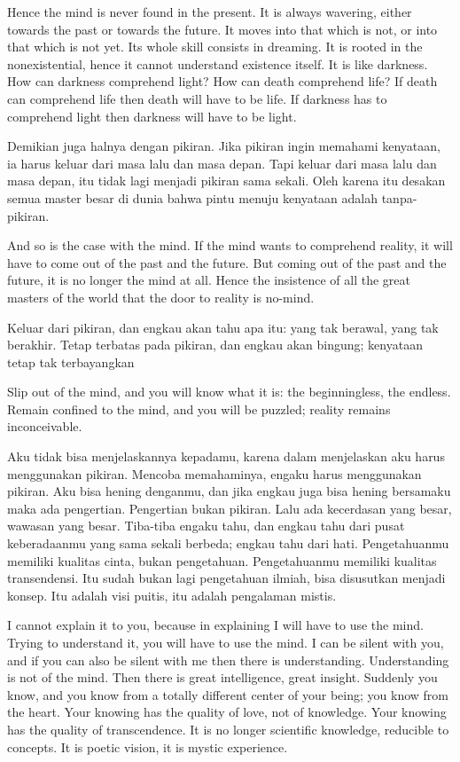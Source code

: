 \english
Hence the mind is never found in the present. It is always wavering, either towards the past or towards the future. It moves into that which is not, or into that which is not yet. Its whole skill consists in dreaming. It is rooted in the nonexistential, hence it cannot understand existence itself. It is like darkness. How can darkness comprehend light? How can death comprehend life? If death can comprehend life then death will have to be life. If darkness has to comprehend light then darkness will have to be light.

\bahasa
Demikian juga halnya dengan pikiran. Jika pikiran ingin memahami kenyataan, ia harus keluar dari masa lalu dan masa depan. Tapi keluar dari masa lalu dan masa depan, itu tidak lagi menjadi pikiran sama sekali. Oleh karena itu desakan semua master besar di dunia bahwa pintu menuju kenyataan adalah tanpa-pikiran.

\english
And so is the case with the mind. If the mind wants to comprehend reality, it will have to come out of the past and the future. But coming out of the past and the future, it is no longer the mind at all. Hence the insistence of all the great masters of the world that the door to reality is no-mind.

\bahasa
Keluar dari pikiran, dan engkau akan tahu apa itu: yang tak berawal, yang tak berakhir. Tetap terbatas pada pikiran, dan engkau akan bingung; kenyataan tetap tak terbayangkan

\english
Slip out of the mind, and you will know what it is: the beginningless, the endless. Remain confined to the mind, and you will be puzzled; reality remains inconceivable.

\bahasa
Aku tidak bisa menjelaskannya kepadamu, karena dalam menjelaskan aku harus menggunakan pikiran. Mencoba memahaminya, engaku harus menggunakan pikiran. Aku bisa hening denganmu, dan jika engkau juga bisa hening bersamaku maka ada pengertian. Pengertian bukan pikiran. Lalu ada kecerdasan yang besar, wawasan yang besar. Tiba-tiba engaku tahu, dan engkau tahu dari pusat keberadaanmu yang sama sekali berbeda; engkau tahu dari hati. Pengetahuanmu memiliki kualitas cinta, bukan pengetahuan. Pengetahuanmu memiliki kualitas transendensi. Itu sudah bukan lagi pengetahuan ilmiah, bisa disusutkan menjadi konsep. Itu adalah visi puitis, itu adalah pengalaman mistis.

\english
I cannot explain it to you, because in explaining I will have to use the mind. Trying to understand it, you will have to use the mind. I can be silent with you, and if you can also be silent with me then there is understanding. Understanding is not of the mind. Then there is great intelligence, great insight. Suddenly you know, and you know from a totally different center of your being; you know from the heart. Your knowing has the quality of love, not of knowledge. Your knowing has the quality of transcendence. It is no longer scientific knowledge, reducible to concepts. It is poetic vision, it is mystic experience.

